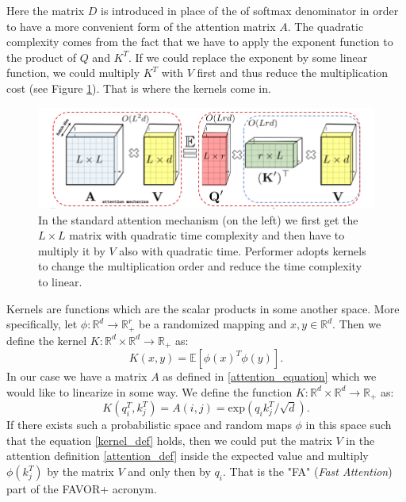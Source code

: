 \documentclass[magisterska,en]{pracamgr}
\begin{document}
Here the matrix $D$ is introduced in place of the of softmax denominator in order to have a more convenient form of the attention matrix $A$. The quadratic complexity comes from the fact that we have to apply the exponent function to the product of $Q$ and $K^T$. If we could replace the exponent by some linear function, we could multiply $K^T$ with $V$ first and thus reduce the multiplication cost (see Figure \ref{performer_idea}). That is where the kernels come in.


\begin{figure}[H]
\centering
\includegraphics[scale=0.5]{./images/performer.png}
\caption{In the standard attention mechanism (on the left) we first get the $L\times L$ matrix with quadratic time complexity and then have to multiply it by $V$ also with quadratic time. Performer adopts kernels to change the multiplication order and reduce the time complexity to linear.}
\label{performer_idea}
\end{figure}




Kernels are functions which are the scalar products in some another space. More specifically, let $\phi : \mathbb{R}^d \rightarrow \mathbb{R}^r_+$ be a randomized mapping and $x, y \in \mathbb{R}^d$. Then we define the kernel $K:\mathbb{R}^d \times \mathbb{R}^d \rightarrow \mathbb{R}_+$ as:
\begin{equation}
    K(x,y) = \mathbb{E} \left[\phi(x)^T\phi(y)\right].
\end{equation}\label{kernel_def}
In our case we have a matrix $A$ as defined in \ref{attention_equation} which we would like to linearize in some way. We define the function $K:\mathbb{R}^d \times \mathbb{R}^d \rightarrow \mathbb{R}_+$ as:
\begin{equation}
    K(q_i^T, k_j^T) = A(i,j) = \textrm{exp}\left(q_i k_j^T/\sqrt{d}\right).
\end{equation}\label{kernel_attention}
If there exists such a probabilistic space and random maps $\phi$ in this space such that the equation \ref{kernel_def} holds, then we could put the matrix $V$ in the attention definition \ref{attention_def} inside the expected value and multiply $\phi(k_j^T)$ by the matrix $V$ and only then by $q_i$. That is the "FA" (\textit{Fast Attention}) part of the FAVOR+ acronym.
\end{document}

